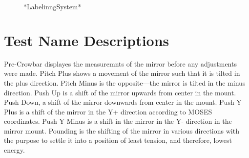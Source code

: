\documentclass{article}
\begin{document}
\begin{figure}
\caption{*LabelinngSystem*}
\label{alltestsminref}
\end{figure}

\section{Test Name Descriptions}\label{descriptors}
Pre-Crowbar displayes the measuremnts of the mirror before any adjustments were made.
Pitch Plus shows a movement of the mirror such that it is tilted in the plus direction.
Pitch Minus is the opposite---the mirror is tilted in the minus direction.
Push Up is a shift of the mirror upwards from center in the mount.
Push Down, a shift of the mirror downwards from center in the mount.
Push  Y Plus is a shift of the mirror in the Y+ direction according to MOSES coordinates.
Push Y Minus is a shift in the mirror in the Y- direction in the mirror mount.
Pounding is the shifting of the mirror in various directions with the purpose to settle it into a position of least tension, and therefore, lowest energy.
\end{document}
